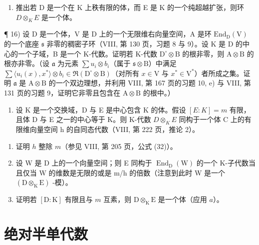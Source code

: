 \begin{enumerate}
\def\labelenumi{\alph{enumi})}
\setcounter{enumi}{1}
\tightlist
\item
  推出若 D 是一个在 K 上秩有限的体，而 E 是 K 的一个纯超越扩张，则环 \(D \otimes_{K} E\) 是一个体。
\end{enumerate}

¶ 16) 设 D 是一个体，V 是 D 上的一个无限维右向量空间，A 是环 \(\mathrm{End}_{\mathrm{D}}(\mathrm{V})\) 的一个底座 \(\mathfrak{s}\) 非零的稠密子环（VIII, 第 130 页，习题 8 与 9）。设 K 是 D 的中心的一个子域，B 是一个 K-代数。证明若 K-代数 \(\mathrm{D}^{\circ} \otimes \mathrm{B}\) 的根非零，则 \(\mathrm{A} \otimes \mathrm{B}\) 的根亦非零。（设 \(\mathfrak{a}\) 为元素 \(\sum u_{i} \otimes b_{i}\)（属于 \(\mathfrak{s} \otimes \mathrm{B}\)）中满足 \(\sum \langle u_{i}(x), x^{*} \rangle \otimes b_{i} \in \Re(\mathrm{D}^{\circ} \otimes \mathrm{B})\)（对所有 \(x \in \mathrm{V}\) 与 \(x^{*} \in \mathrm{V}^{*}\)）者所成之集。证明 \(\mathfrak{a}\) 是 \(\mathrm{A} \otimes \mathrm{B}\) 的一个双边理想，并利用 VIII, 第 167 页的习题 10, e) 与 VIII, 第 131 页的习题 9，证明它非零且包含在 \(\mathrm{A} \otimes \mathrm{B}\) 的根中。）

\begin{enumerate}
\def\labelenumi{\arabic{enumi})}
\setcounter{enumi}{16}
\tightlist
\item
  设 K 是一个交换域，D 与 E 是中心包含 K 的体。假设 \([E:K]=m\) 有限，且体 D 与 E 之一的中心等于 K。则 K-代数 \(D\otimes_{K}E\) 同构于一个体 C 上的有限维向量空间 h 的自同态代数（VIII, 第 222 页，推论 2）。
\end{enumerate}

\begin{enumerate}
\def\labelenumi{\alph{enumi})}
\item
  证明 \(h\) 整除 \(m\)（参见 VIII, 第 205 页，公式 (32)）。
\item
  设 W 是 D 上的一个向量空间；则 E 同构于 \(\operatorname{End}_{\mathrm{D}}(\mathrm{W})\) 的一个 K-子代数当且仅当 W 的维数是无限的或是 m/h 的倍数（注意到此时 W 是一个 \((\mathrm{D} \otimes_{\mathrm{K}} \mathrm{E})\) -模）。
\item
  证明若 \([\mathrm{D}:\mathrm{K}]\) 有限且与 \(m\) 互素，则 \(\mathrm{D}\otimes_{\mathrm{K}}\mathrm{E}\) 是一个体（应用 \(a\)）。
\end{enumerate}

\section{绝对半单代数}

